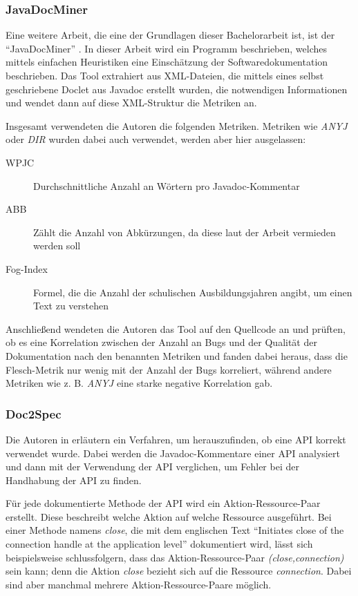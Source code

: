 \subsubsection{JavaDocMiner}
Eine weitere Arbeit, die eine der Grundlagen dieser Bachelorarbeit ist, ist der \enquote{JavaDocMiner} \cite[S. 68-79]{AutomaticQualityAssessmentofSourceCodeComments:TheJavadocMiner}. In dieser Arbeit wird ein Programm beschrieben, welches mittels einfachen Heuristiken eine Einschätzung der Softwaredokumentation beschrieben. Das Tool extrahiert aus XML-Dateien, die mittels eines selbst geschriebene Doclet aus Javadoc erstellt wurden, die notwendigen Informationen und wendet dann auf diese XML-Struktur die Metriken an. 

Insgesamt verwendeten die Autoren die folgenden Metriken. Metriken wie \textit{ANYJ} oder \textit{DIR} wurden dabei auch verwendet, werden aber hier ausgelassen:
\begin{description}
    \item[WPJC] Durchschnittliche Anzahl an Wörtern pro Javadoc-Kommentar
    \item[ABB] Zählt die Anzahl von Abkürzungen, da diese laut der Arbeit vermieden werden soll
    \item[Fog-Index] Formel, die die Anzahl der schulischen Ausbildungsjahren angibt, um einen Text zu verstehen 
\end{description}

Anschließend wendeten die Autoren das Tool auf den Quellcode an und prüften, ob es eine Korrelation zwischen der Anzahl an Bugs und der Qualität der Dokumentation nach den benannten Metriken und fanden dabei heraus, dass die Flesch-Metrik nur wenig mit der Anzahl der Bugs korreliert, während andere Metriken wie z. B. \textit{ANYJ} eine starke negative Korrelation gab. 

\subsubsection{Doc2Spec}
Die Autoren in \cite[S. 307ff.]{InferringResourceSpecificationsfromNaturalLanguageAPIDocumentation} erläutern ein Verfahren, um herauszufinden, ob eine API korrekt verwendet wurde. Dabei werden die Javadoc-Kommentare einer API analysiert und dann mit der Verwendung der API verglichen, um Fehler bei der Handhabung der API zu finden. 

Für jede dokumentierte Methode der API wird ein Aktion-Ressource-Paar erstellt. Diese beschreibt welche Aktion auf welche Ressource ausgeführt. Bei einer Methode namens \textit{close}, die mit dem englischen Text \enquote{Initiates close of the connection handle at the
application level} dokumentiert wird, lässt sich beispielsweise schlussfolgern, dass das Aktion-Ressource-Paar \textit{(close,connection)} sein kann; denn die Aktion \textit{close} bezieht sich auf die Ressource \textit{connection}. Dabei sind aber manchmal mehrere Aktion-Ressource-Paare möglich\cite[S. 308]{InferringResourceSpecificationsfromNaturalLanguageAPIDocumentation}.


